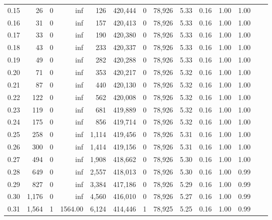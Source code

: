 \begin{tabular}{rrrrrrrrrrrrrr}
0.15 &      26 &      0 &      inf &      126 &  420,444 &       0 &  78,926 &  5.33 &  0.16 &  1.00 &      1.00 \\
0.16 &      31 &      0 &      inf &      157 &  420,413 &       0 &  78,926 &  5.33 &  0.16 &  1.00 &      1.00 \\
0.17 &      33 &      0 &      inf &      190 &  420,380 &       0 &  78,926 &  5.33 &  0.16 &  1.00 &      1.00 \\
0.18 &      43 &      0 &      inf &      233 &  420,337 &       0 &  78,926 &  5.33 &  0.16 &  1.00 &      1.00 \\
0.19 &      49 &      0 &      inf &      282 &  420,288 &       0 &  78,926 &  5.33 &  0.16 &  1.00 &      1.00 \\
0.20 &      71 &      0 &      inf &      353 &  420,217 &       0 &  78,926 &  5.32 &  0.16 &  1.00 &      1.00 \\
0.21 &      87 &      0 &      inf &      440 &  420,130 &       0 &  78,926 &  5.32 &  0.16 &  1.00 &      1.00 \\
0.22 &     122 &      0 &      inf &      562 &  420,008 &       0 &  78,926 &  5.32 &  0.16 &  1.00 &      1.00 \\
0.23 &     119 &      0 &      inf &      681 &  419,889 &       0 &  78,926 &  5.32 &  0.16 &  1.00 &      1.00 \\
0.24 &     175 &      0 &      inf &      856 &  419,714 &       0 &  78,926 &  5.32 &  0.16 &  1.00 &      1.00 \\
0.25 &     258 &      0 &      inf &    1,114 &  419,456 &       0 &  78,926 &  5.31 &  0.16 &  1.00 &      1.00 \\
0.26 &     300 &      0 &      inf &    1,414 &  419,156 &       0 &  78,926 &  5.31 &  0.16 &  1.00 &      1.00 \\
0.27 &     494 &      0 &      inf &    1,908 &  418,662 &       0 &  78,926 &  5.30 &  0.16 &  1.00 &      1.00 \\
0.28 &     649 &      0 &      inf &    2,557 &  418,013 &       0 &  78,926 &  5.30 &  0.16 &  1.00 &      0.99 \\
0.29 &     827 &      0 &      inf &    3,384 &  417,186 &       0 &  78,926 &  5.29 &  0.16 &  1.00 &      0.99 \\
0.30 &   1,176 &      0 &      inf &    4,560 &  416,010 &       0 &  78,926 &  5.27 &  0.16 &  1.00 &      0.99 \\
0.31 &   1,564 &      1 &  1564.00 &    6,124 &  414,446 &       1 &  78,925 &  5.25 &  0.16 &  1.00 &      0.99 \\

\end{tabular}
